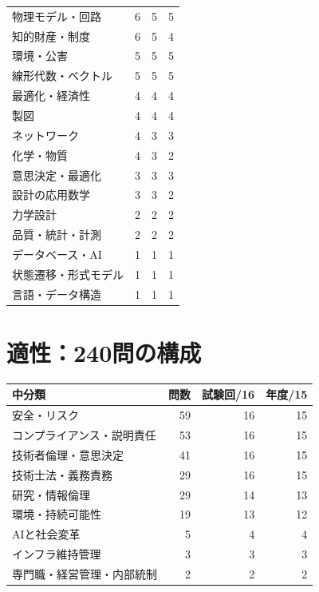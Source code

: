 \begin{longtable}{p{.57\linewidth}rrr}
物理モデル・回路 & 6 & 5 & 5\\
知的財産・制度 & 6 & 5 & 4\\
環境・公害 & 5 & 5 & 5\\
線形代数・ベクトル & 5 & 5 & 5\\
最適化・経済性 & 4 & 4 & 4\\
製図 & 4 & 4 & 4\\
ネットワーク & 4 & 3 & 3\\
化学・物質 & 4 & 3 & 2\\
意思決定・最適化 & 3 & 3 & 3\\
設計の応用数学 & 3 & 3 & 2\\
力学設計 & 2 & 2 & 2\\
品質・統計・計測 & 2 & 2 & 2\\
データベース・AI & 1 & 1 & 1\\
状態遷移・形式モデル & 1 & 1 & 1\\
言語・データ構造 & 1 & 1 & 1\\
\end{longtable}
\section{適性：240問の構成}
\begin{longtable}{p{.57\linewidth}rrr}
中分類 & 問数 & 試験回/16 & 年度/15\\\hline
安全・リスク & 59 & 16 & 15\\
コンプライアンス・説明責任 & 53 & 16 & 15\\
技術者倫理・意思決定 & 41 & 16 & 15\\
技術士法・義務責務 & 29 & 16 & 15\\
研究・情報倫理 & 29 & 14 & 13\\
環境・持続可能性 & 19 & 13 & 12\\
AIと社会変革 & 5 & 4 & 4\\
インフラ維持管理 & 3 & 3 & 3\\
専門職・経営管理・内部統制 & 2 & 2 & 2\\
\end{longtable}
